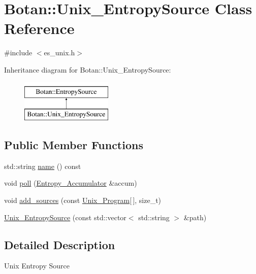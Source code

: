 \hypertarget{classBotan_1_1Unix__EntropySource}{\section{Botan\-:\-:Unix\-\_\-\-Entropy\-Source Class Reference}
\label{classBotan_1_1Unix__EntropySource}
}


{\ttfamily \#include $<$es\-\_\-unix.\-h$>$}

Inheritance diagram for Botan\-:\-:Unix\-\_\-\-Entropy\-Source\-:\begin{figure}[H]
\begin{center}
\leavevmode
\includegraphics[height=2.000000cm]{classBotan_1_1Unix__EntropySource}
\end{center}
\end{figure}
\subsection*{Public Member Functions}
\begin{DoxyCompactItemize}
\item 
std\-::string \hyperlink{classBotan_1_1Unix__EntropySource_a50c443e54a8594111e193be7c9d81086}{name} () const 
\item 
void \hyperlink{classBotan_1_1Unix__EntropySource_aff421933d70529310e2252ad005bf94f}{poll} (\hyperlink{classBotan_1_1Entropy__Accumulator}{Entropy\-\_\-\-Accumulator} \&accum)
\item 
void \hyperlink{classBotan_1_1Unix__EntropySource_ac761fb67e7a11b57c8bf790d8bbdea52}{add\-\_\-sources} (const \hyperlink{structBotan_1_1Unix__Program}{Unix\-\_\-\-Program}\mbox{[}$\,$\mbox{]}, size\-\_\-t)
\item 
\hyperlink{classBotan_1_1Unix__EntropySource_ac7593490cca89e1caa61acf8fcb9d367}{Unix\-\_\-\-Entropy\-Source} (const std\-::vector$<$ std\-::string $>$ \&path)
\end{DoxyCompactItemize}


\subsection{Detailed Description}
Unix Entropy Source 

